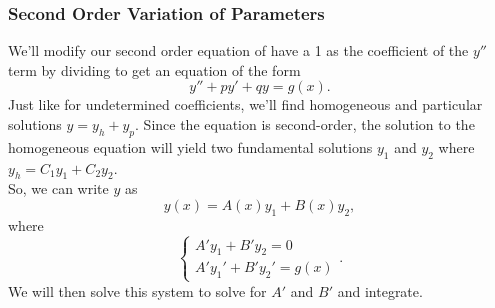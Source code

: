 \subsubsection{Second Order Variation of Parameters}
\noindent
We'll modify our second order equation of have a 1 as the coefficient of the $y''$ term by dividing to get an equation of the form
\begin{equation*}
	y'' + py' + qy = g(x).
\end{equation*}
Just like for undetermined coefficients, we'll find homogeneous and particular solutions $y = y_h + y_p$.
Since the equation is second-order, the solution to the homogeneous equation will yield two fundamental solutions $y_1$ and $y_2$ where $y_h = C_1y_1 + C_2y_2$.\\

\noindent
So, we can write $y$ as
\begin{equation*}
	y(x) = A(x)y_1 + B(x)y_2,
\end{equation*}
where
\begin{equation*}
	\begin{cases}
		A'y_1  + B'y_2  = 0 \\
		A'y_1' + B'y_2' = g(x)
	\end{cases}.
\end{equation*}
We will then solve this system to solve for $A'$ and $B'$ and integrate.

